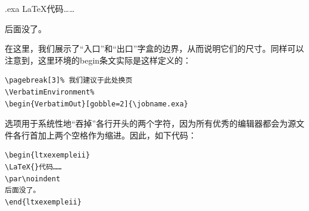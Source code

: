 \newenvironment{ltxexempleii}{%
  \setlength{\fboxsep}{.5pt}%
  \VerbatimEnvironment%
  \begin{VerbatimOut}[gobble=2]{\jobname.exa}}{%
  \end{VerbatimOut}%
  \begin{ltxexempleenv}%
    \savebox{\b@iteentree}{%
      \begin{boxedminipage}{\ltxexinputwidthratio\linewidth}
        \VerbatimInput{\jobname.exa}
      \end{boxedminipage}}%
    \savebox{\b@itesortie}{%
      \begin{boxedminipage}{\ltxexoutputwidthratio\linewidth} 
        \setlength{\parindent}{10pt}%
        
      \end{boxedminipage}}%
    \usebox{\b@iteentree}%
    \usebox{\b@itesortie}
  \end{ltxexempleenv}}%
\makeatother%

\begin{ltxexempleii}
  \LaTeX{}代码……
  \par\noindent
  后面没了。
\end{ltxexempleii}

在这里，我们展示了“入口”和“出口”字盒的边界，从而说明它们的尺寸。同样可以注意到，这里环境的begin条文实际是这样定义的：

\begin{dmd}
\begin{verbatim}
\pagebreak[3]% 我们建议于此处换页
\VerbatimEnvironment% 
\begin{VerbatimOut}[gobble=2]{\jobname.exa}\end{verbatim}
\end{dmd}

选项\dm{[gobble=2]}用于系统性地“吞掉”各行开头的两个字符，因为所有优秀的编辑器都会为源文件各行首加上两个空格作为缩进。因此，如下代码：

\begin{dmd}
\begin{verbatim}
\begin{ltxexempleii}
\LaTeX{}代码……
\par\noindent
后面没了。
\end{ltxexempleii}\end{verbatim}
\end{dmd}

